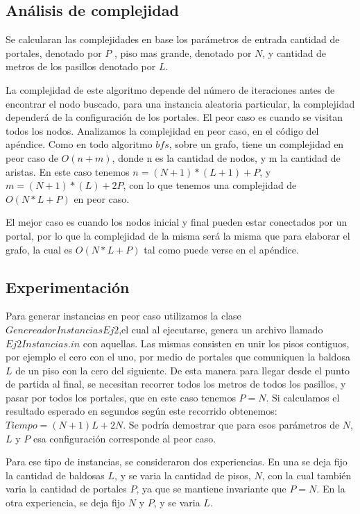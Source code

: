 \subsection{Análisis de complejidad}



Se calcularan las complejidades en base los parámetros de entrada cantidad de portales, denotado por $ P $ , piso mas grande, denotado por $ N $, y cantidad de metros de los pasillos denotado por $ L $.

La complejidad de este algoritmo depende del número de iteraciones antes de encontrar el nodo buscado, para una instancia aleatoria particular, la complejidad dependerá de la configuración de los portales.
El peor caso es cuando se visitan todos los nodos. Analizamos la complejidad en peor caso, en el código del apéndice.  Como en todo algoritmo $bfs$, sobre un grafo, tiene un complejidad en peor caso de $O(n+m)$, donde n es la cantidad de nodos, y m la cantidad de aristas. En este caso tenemos $n=(N+1)*(L+1) +P$, y $m= (N+1)*(L) +2P$, con lo que tenemos una complejidad de $O(N*L+P)$ en peor caso.

El mejor caso es cuando los nodos inicial y final pueden estar conectados por un portal, por lo que la complejidad de la misma será la misma que para elaborar el grafo, la cual es $ O(N*L+P) $ tal como puede verse en el apéndice.


\subsection{Experimentación}

Para generar instancias en peor caso utilizamos la clase $ GenereadorInstanciasEj2 $,el cual al ejecutarse, genera un archivo llamado $ Ej2Instancias.in $ con aquellas. Las mismas consisten en unir los pisos contiguos, por ejemplo el cero con el uno, por medio de portales que comuniquen la baldosa $ L $ de un piso con la cero 
del siguiente. De esta manera para llegar desde el punto de partida al final, se necesitan recorrer todos los metros de todos los pasillos, y pasar por todos los portales, que en este caso tenemos $ P=N $. Si calculamos el resultado esperado en segundos según este recorrido obtenemos: $ Tiempo=(N+1)L+2N $. Se podría demostrar que para esos parámetros de $ N $, $ L $ y $ P $ esa configuración corresponde al peor caso.

Para ese tipo de instancias, se consideraron dos experiencias. En una se deja fijo la cantidad de baldosas $ L $, y se varia la cantidad de pisos, $ N $, con la cual también varia la cantidad de portales $ P $, ya que se mantiene invariante que $ P=N $. En la otra experiencia, se deja fijo $ N $ y $ P $, y se varia $ L $. 

